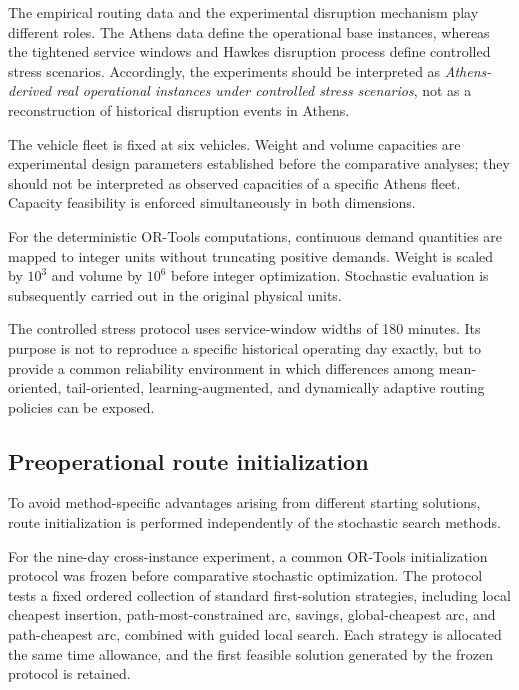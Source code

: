 \documentclass[preprint,12pt]{elsarticle}
\newcommand{\1}{\mathbf{1}}
\begin{document}
The empirical routing data and the experimental disruption mechanism play
different roles. The Athens data define the operational base instances, whereas
the tightened service windows and Hawkes disruption process define controlled
stress scenarios. Accordingly, the experiments should be interpreted as
\emph{Athens-derived real operational instances under controlled stress
	scenarios}, not as a reconstruction of historical disruption events in Athens.

The vehicle fleet is fixed at six vehicles. Weight and volume capacities are
experimental design parameters established before the comparative analyses;
they should not be interpreted as observed capacities of a specific Athens
fleet. Capacity feasibility is enforced simultaneously in both dimensions.

For the deterministic OR-Tools computations, continuous demand quantities are
mapped to integer units without truncating positive demands. Weight is scaled by
$10^3$ and volume by $10^6$ before integer optimization. Stochastic evaluation
is subsequently carried out in the original physical units.

The controlled stress protocol uses service-window widths of 180 minutes.
Its purpose is not to reproduce a specific historical operating day exactly,
but to provide a common reliability environment in which differences among
mean-oriented, tail-oriented, learning-augmented, and dynamically adaptive
routing policies can be exposed.

\subsection{Preoperational route initialization}
\label{subsec:initialization}

To avoid method-specific advantages arising from different starting solutions,
route initialization is performed independently of the stochastic search
methods.

For the nine-day cross-instance experiment, a common OR-Tools initialization
protocol was frozen before comparative stochastic optimization.
The protocol tests a fixed ordered collection of standard first-solution
strategies, including local cheapest insertion, path-most-constrained arc,
savings, global-cheapest arc, and path-cheapest arc, combined with guided local
search. Each strategy is allocated the same time allowance, and the first
feasible solution generated by the frozen protocol is retained.
\end{document}
